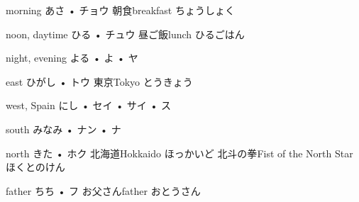 



\setcounter{cardnum}{1}

		{morning}
		{あさ • チョウ}
		{朝食}{breakfast ちょうしょく}
		{}{}
		{}{}
		{}{}
		{}{}

		{noon, daytime}
		{ひる • チュウ}
		{昼ご飯}{lunch ひるごはん}
		{}{}
		{}{}
		{}{}
		{}{}

		{night, evening}
		{よる • よ • ヤ}
		{}{}
		{}{}
		{}{}
		{}{}
		{}{}

		{east}
		{ひがし • トウ}
		{東京}{Tokyo とうきょう}
		{}{}
		{}{}
		{}{}
		{}{}

		{west, Spain}
		{にし • セイ • サイ • ス}
		{}{}
		{}{}
		{}{}
		{}{}
		{}{}

		{south}
		{みなみ • ナン • ナ}
		{}{}
		{}{}
		{}{}
		{}{}
		{}{}

		{north}
		{きた • ホク}
		{北海道}{Hokkaido ほっかいど}
		{北斗の拳}{Fist of the North Star ほくとのけん}
		{}{}
		{}{}
		{}{}

		{father}
		{ちち • フ}
		{お父さん}{father おとうさん}
		{}{}
		{}{}
		{}{}
		{}{}

